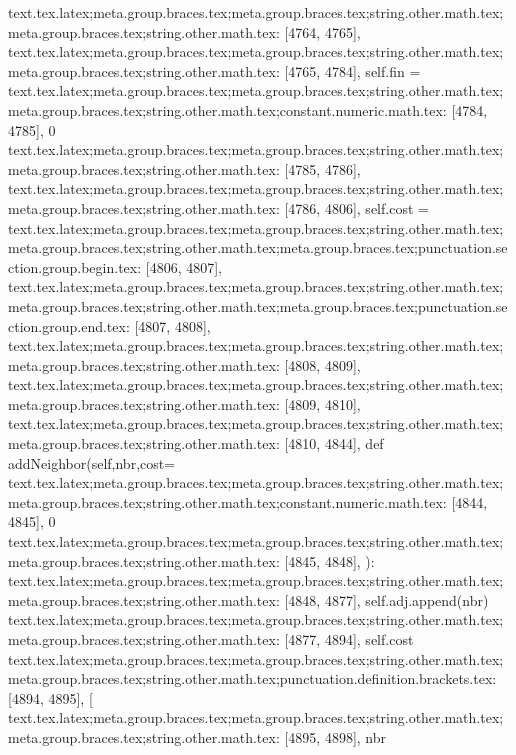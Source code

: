 {{{{{{{{{{{{{{{{{{{{{{{{{{{{{{{{{{{{{{{{{{{{{{{{{{{{{{{{{{{{{{{{{{{{{{{{{{{{{{{{{{{{{{{{{{{{{{{{{{{{{{{{{{{{{{{{{{{{{{{{{{{{{{{{{{{{{{{{{{{{{{{{text.tex.latex;meta.group.braces.tex;meta.group.braces.tex;string.other.math.tex;meta.group.braces.tex;string.other.math.tex: [4764, 4765], {
}
text.tex.latex;meta.group.braces.tex;meta.group.braces.tex;string.other.math.tex;meta.group.braces.tex;string.other.math.tex: [4765, 4784], {        self.fin = }
text.tex.latex;meta.group.braces.tex;meta.group.braces.tex;string.other.math.tex;meta.group.braces.tex;string.other.math.tex;constant.numeric.math.tex: [4784, 4785], {0}
text.tex.latex;meta.group.braces.tex;meta.group.braces.tex;string.other.math.tex;meta.group.braces.tex;string.other.math.tex: [4785, 4786], {
}
text.tex.latex;meta.group.braces.tex;meta.group.braces.tex;string.other.math.tex;meta.group.braces.tex;string.other.math.tex: [4786, 4806], {        self.cost = }
text.tex.latex;meta.group.braces.tex;meta.group.braces.tex;string.other.math.tex;meta.group.braces.tex;string.other.math.tex;meta.group.braces.tex;punctuation.section.group.begin.tex: [4806, 4807], {{}
text.tex.latex;meta.group.braces.tex;meta.group.braces.tex;string.other.math.tex;meta.group.braces.tex;string.other.math.tex;meta.group.braces.tex;punctuation.section.group.end.tex: [4807, 4808], {}}
text.tex.latex;meta.group.braces.tex;meta.group.braces.tex;string.other.math.tex;meta.group.braces.tex;string.other.math.tex: [4808, 4809], {
}
text.tex.latex;meta.group.braces.tex;meta.group.braces.tex;string.other.math.tex;meta.group.braces.tex;string.other.math.tex: [4809, 4810], {
}
text.tex.latex;meta.group.braces.tex;meta.group.braces.tex;string.other.math.tex;meta.group.braces.tex;string.other.math.tex: [4810, 4844], {    def addNeighbor(self,nbr,cost=}
text.tex.latex;meta.group.braces.tex;meta.group.braces.tex;string.other.math.tex;meta.group.braces.tex;string.other.math.tex;constant.numeric.math.tex: [4844, 4845], {0}
text.tex.latex;meta.group.braces.tex;meta.group.braces.tex;string.other.math.tex;meta.group.braces.tex;string.other.math.tex: [4845, 4848], {):
}
text.tex.latex;meta.group.braces.tex;meta.group.braces.tex;string.other.math.tex;meta.group.braces.tex;string.other.math.tex: [4848, 4877], {        self.adj.append(nbr)
}
text.tex.latex;meta.group.braces.tex;meta.group.braces.tex;string.other.math.tex;meta.group.braces.tex;string.other.math.tex: [4877, 4894], {        self.cost}
text.tex.latex;meta.group.braces.tex;meta.group.braces.tex;string.other.math.tex;meta.group.braces.tex;string.other.math.tex;punctuation.definition.brackets.tex: [4894, 4895], {[}
text.tex.latex;meta.group.braces.tex;meta.group.braces.tex;string.other.math.tex;meta.group.braces.tex;string.other.math.tex: [4895, 4898], {nbr}
}}}}}}}}}}}}}}}}}}}}}}}}}}}}}}}}}}}}}}}}}}}}}}}}}}}}}}}}}}}}}}}}}}}}}}}}}}}}}}}}}}}}}}}}}}}}}}}}}}}}}}}}}}}}}}}}}}}}}}}}}}}}}}}}}}}}}}}}}}}}}}}}
